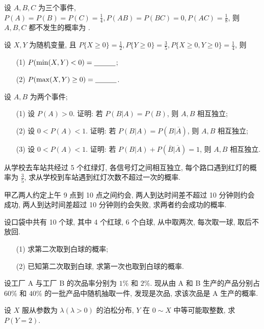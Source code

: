 \documentclass[padp]{ExBook}
\begin{document}
\begin{qitems}
\begin{bbox}
    \end{bbox}
    \begin{bbox}
        \qitem  设 $A, B, C$ 为三个事件, $P(A)=P(B)=P(C)=\frac{1}{4}, P(AB)=P(BC)=0, P(AC)=\frac{1}{8}$, 则 $A, B, C$ 都不发生的概率为 \blankline.
    \end{bbox}
    \begin{bbox}
        \qitem  设 $X, Y$ 为随机变量, 且 $P\{X \ge 0\} = \frac{1}{2}, P\{Y \ge 0\} = \frac{3}{5}, P\{X \ge 0, Y \ge 0\} = \frac{1}{4}$, 则
\begin{enumerate}
    \item[(1)] $P(\min(X,Y) < 0) = \underline{\hspace{3em}}$;
    \item[(2)] $P(\max(X,Y) \ge 0) = \underline{\hspace{3em}}$.
\end{enumerate}
    \end{bbox}
    \begin{bbox}
        \qitem  设 $A, B$ 为两个事件;
\begin{enumerate}
    \item[(1)] 设 $P(A)>0$. 证明: 若 $P(B|A) = P(B)$, 则 $A, B$ 相互独立;
    \item[(2)] 设 $0 < P(A) < 1$. 证明: 若 $P(B|A) = P(B|\overline{A})$, 则 $A, B$ 相互独立;
    \item[(3)] 设 $0 < P(A) < 1$. 证明: 若 $P(B|A) + P(\overline{B}|\overline{A}) = 1$, 则 $A, B$ 相互独立.
\end{enumerate}
    \end{bbox}
    \begin{bbox}
        \qitem  从学校去车站共经过 5 个红绿灯, 各信号灯之间相互独立, 每个路口遇到红灯的概率为 $\frac{3}{5}$, 求从学校到车站遇到红灯次数不超过一次的概率.
    \end{bbox}
     \begin{bbox}
        \qitem  甲乙两人约定上午 9 点到 10 点之间约会, 两人到达时间差不超过 10 分钟则约会成功, 两人到达时间差超过 10 分钟则约会失败, 求两者约会成功的概率.
    \end{bbox}
    \begin{bbox}
        \qitem  设口袋中共有 10 个球, 其中 4 个红球, 6 个白球, 从中取两次, 每次取一球, 取后不放回.
\begin{enumerate}
    \item[(1)] 求第二次取到白球的概率;
    \item[(2)] 已知第二次取到白球, 求第一次也取到白球的概率.
\end{enumerate}
    \end{bbox}
     \begin{bbox}
        \qitem  设工厂 A 与工厂 B 的次品率分别为 $1\%$ 和 $2\%$. 现从由 A 和 B 生产的产品分别占 $60\%$ 和 $40\%$ 的一批产品中随机抽取一件, 发现是次品, 求该次品是 A 生产的概率.
    \end{bbox}
    \begin{bbox}
        \qitem  设 $X$ 服从参数为 $\lambda (\lambda > 0)$ 的泊松分布, $Y$ 在 $0 \sim X$ 中等可能取整数, 求 $P(Y=2)$.
    \end{bbox}
   
\end{qitems}
\end{document}
